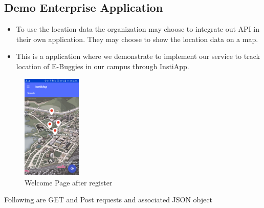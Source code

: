 \documentclass{article}
\begin{document}
\subsection{Demo Enterprise Application}
\begin{itemize}
\item To use the location data the organization may choose to integrate out API in their own application. They may choose to show the location data on a map. 
\item This is a application where we demonstrate to implement our service to track location of E-Buggies in our campus through InstiApp.
\end{itemize}
\begin{figure}[h]
\centering
    \includegraphics[width=0.25\textwidth]{images/Insti.png}
    \caption{Welcome Page after register}
\end{figure}
\newpage
Following are GET and Post requests and associated JSON object
\end{document}
